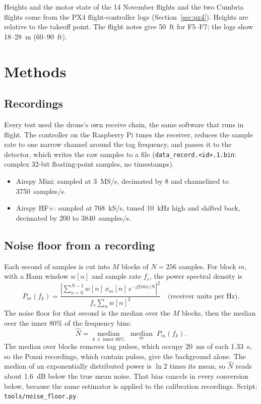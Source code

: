 \documentclass[11pt]{article}
\begin{document}
\noindent Heights and the motor state of the 14 November flights and the two Cumbria flights come from
the PX4 flight-controller logs (Section~\ref{sec:px4}). Heights are relative to the takeoff point.
The flight notes give 50~ft for F5--F7; the logs show 18--28~m (60--90~ft).

\section{Methods}
\label{sec:methods}

\subsection{Recordings}
Every test used the drone's own receive chain, the same software that runs in flight. The
controller on the Raspberry Pi tunes the receiver, reduces the sample rate to one narrow channel
around the tag frequency, and passes it to the detector, which writes the raw samples to a file
(\texttt{data\_record.<id>.1.bin}: complex 32-bit floating-point samples, no timestamps).
\begin{itemize}
\item Airspy Mini: sampled at 3~MS/s, decimated by 8 and channelized to 3750~samples/s.
\item Airspy HF+: sampled at 768~kS/s, tuned 10~kHz high and shifted back, decimated by 200 to
3840~samples/s.
\end{itemize}

\subsection{Noise floor from a recording}
Each second of samples is cut into $M$ blocks of $N=256$ samples. For block $m$, with a Hann window
$w[n]$ and sample rate $f_s$, the power spectral density is
\begin{equation}
P_m(f_k) = \frac{\left|\sum_{n=0}^{N-1} w[n]\,x_m[n]\,e^{-j2\pi kn/N}\right|^2}{f_s\sum_{n} w[n]^2}
\quad\text{(receiver units per Hz).}
\end{equation}
The noise floor for that second is the median over the $M$ blocks, then the median over the inner
80\% of the frequency bins:
\begin{equation}
\hat N = \operatorname*{median}_{k\,\in\,\text{inner }80\%}\;\operatorname*{median}_{m}\;P_m(f_k).
\end{equation}
The median over blocks removes tag pulses, which occupy 20~ms of each 1.33~s, so the Ponui
recordings, which contain pulses, give the background alone. The median of an exponentially
distributed power is $\ln 2$ times its mean, so $\hat N$ reads about 1.6~dB below the true mean
noise. That bias cancels in every conversion below, because the same estimator is applied to the
calibration recordings. Script: \texttt{tools/noise\_floor.py}.
\end{document}
